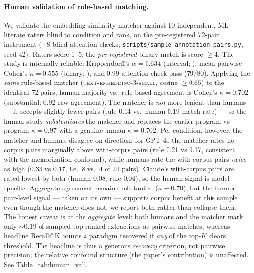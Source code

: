 \documentclass[11pt]{article}
\begin{document}
\paragraph{Human validation of rule-based matching.}
We validate the embedding-similarity matcher against 10 independent, ML-literate raters blind to condition and rank, on the pre-registered 72-pair instrument ($+8$ blind attention checks; \texttt{scripts/sample\_annotation\_pairs.py}, seed 42). Raters score 1--5; the \emph{pre-registered} binary match is score $\geq 4$. The study is internally reliable: Krippendorff's $\alpha = 0.634$ (interval; \citealp{krippendorff2018content}), mean pairwise Cohen's $\kappa = 0.555$ (binary; \citealp{cohen1960coefficient}), and 0.99 attention-check pass (79/80). Applying the \emph{same} rule-based matcher (\textsc{text-embedding-3-small}, cosine $\geq 0.65$) to the identical 72 pairs, human-majority vs.\ rule-based agreement is Cohen's $\kappa = 0.702$ (substantial; 0.92 raw agreement). The matcher is \emph{not} more lenient than humans --- it accepts slightly fewer pairs (rule 0.14 vs.\ human 0.19 match rate) --- so the human study \emph{substantiates} the matcher and replaces the earlier program-vs-program $\kappa = 0.97$ with a genuine human $\kappa = 0.702$. Per-condition, however, the matcher and humans disagree on direction: for GPT-4o the matcher rates no-corpus pairs marginally above with-corpus pairs (rule 0.21 vs 0.17, consistent with the memorization confound), while humans rate the with-corpus pairs \emph{twice} as high (0.33 vs 0.17, i.e.\ 8 vs.\ 4 of 24 pairs). Claude's with-corpus pairs are rated lowest by both (human 0.08, rule 0.04), so the human signal is model-specific. Aggregate agreement remains substantial ($\kappa{=}0.70$), but the human pair-level signal --- taken on its own --- supports corpus benefit at this sample even though the matcher does not; we report both rather than collapse them. The honest caveat is at the \emph{aggregate} level: both humans and the matcher mark only $\sim$0.19 of sampled top-ranked extractions as pairwise matches, whereas headline Recall@K counts a paradigm recovered if \emph{any} of the top-$K$ clears threshold. The headline is thus a generous \emph{recovery} criterion, not pairwise precision; the relative confound structure (the paper's contribution) is unaffected. See Table~\ref{tab:human_val}.
\end{document}
